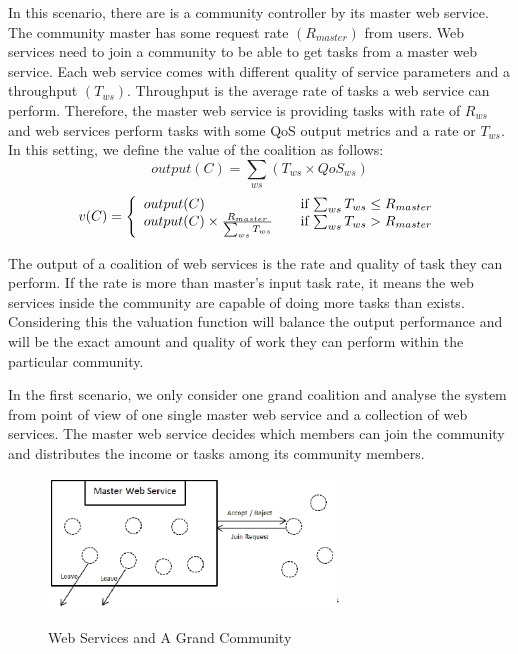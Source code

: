 \documentclass[10pt, conference, compsocconf]{IEEEtran}
\theoremstyle{plain}
\theoremstyle{definition}
\begin{document}
In this scenario, there are is a community controller by its master web service. The community master has some request rate $(R_{master})$ from users. Web services need to join a community to be able to get tasks from a master web service. Each web service comes with different quality of service parameters and a throughput $(T_{ws})$. Throughput is the average rate of tasks a web service can perform. Therefore, the master web service is providing tasks with rate of $R_{ws}$ and web services perform tasks with some QoS output metrics and a rate or $T_{ws}$. 
In this setting, we define the value of the coalition as follows:
\begin{equation*}
output(C) = \sum_{ws}{(T_{ws} \times QoS_{ws})}
\end{equation*}
\setlength{\abovedisplayshortskip}{2pt}
\begin{equation*}
v(C) = \left\{ 
  \begin{array}{l l}
    output(C) & \quad \text{if $\sum_{ws}{T_{ws}} \leq R_{master}$}\\
    output(C) \times \frac{R_{master}}{\sum_{ws}{T_{ws}}} & \quad \text{if $\sum_{ws}{T_{ws}} > R_{master}$}
  \end{array} \right.
\end{equation*}  

The output of a coalition of web services is the rate and quality of task they can perform. If the rate is more than master's input task rate, it means the web services inside the community are capable of doing more tasks than exists. Considering this the valuation function will balance the output performance and will be the exact amount and quality of work they can perform within the particular community. %

In the first scenario, we only consider one grand coalition and analyse the system from point of view of one single master web service and a collection of web services. The master web service decides which members can join %
the community and distributes the income or tasks among its community members.

\begin{figure}[!t]
\centering
\includegraphics[width=3in]{s1.eps}`
\caption{Web Services and A Grand Community}
\label{fig_sim}
\end{figure}
\end{document}
